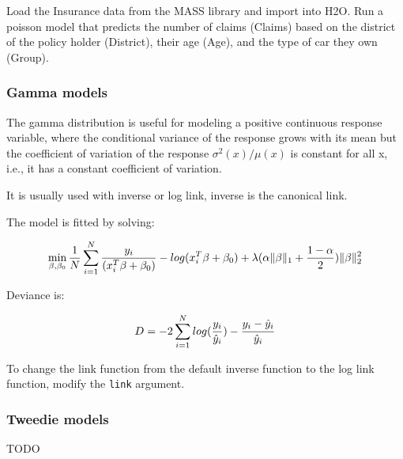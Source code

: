 Load the Insurance data from the MASS library and import into H2O. Run a poisson model that predicts the number of
claims (Claims) based on the district of the policy holder (District), their age (Age), and the type of car they
own (Group).



\waterExampleInPython


\subsubsection{Gamma models}
The gamma distribution is useful for modeling a positive continuous response variable, where the conditional
variance of the response grows with its mean but the coefficient of variation of the response $\sigma^2(x)/μ(x)$ is
constant for all x, i.e., it has a constant coefficient of variation.

It is usually used with inverse or log link, inverse is the canonical link.

The model is fitted by solving:

\[  \min\limits_{\beta,\beta_0} { {1 \over N}\sum\limits_{i=1}\limits^{N}{y_i \over (x_i^{T}\beta  + \beta_0)} - log({x_i^{T}\beta  + \beta_0})  + \lambda (\alpha \|\beta \|_1 + {1-\alpha \over 2}) \| \beta \|_2^2} \]

Deviance is:

\[D = -2\sum\limits_{i=1}\limits^{N}{log({y_i \over \hat{y}_i}) - {y_i - \hat{y}_i \over\hat{y}_i }}\]

\waterExampleInR

To change the link function from the default inverse function to the log link function, modify the \texttt{link}
argument.



\waterExampleInPython


\subsubsection{Tweedie models}

TODO

\waterExampleInR


\waterExampleInPython


